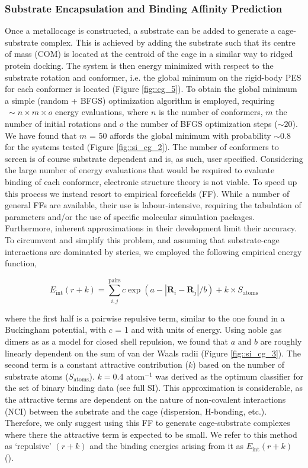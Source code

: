 \documentclass[../../main.tex]{subfiles}
\begin{document}
\subsubsection{Substrate Encapsulation and Binding Affinity Prediction}
 Once a metallocage is constructed, a substrate can be added to generate a cage-substrate complex. This is achieved by adding the substrate such that its centre of mass (COM) is located at the centroid of the cage in a similar way to ridged protein docking. The system is then energy minimized with respect to the substrate rotation and conformer, i.e. the global minimum on the rigid-body PES for each conformer is located (Figure \ref{fig::cg_5}). To obtain the global minimum a simple (random + BFGS) optimization algorithm is employed,\cite{SciPy} requiring $~\sim n\times m\times o$ energy evaluations, where $n$ is the number of conformers, $m$ the number of initial rotations and $o$ the number of BFGS optimization steps ($\sim20$). We have found that $m$ = 50 affords the global minimum with probability $\sim0.8$ for the systems tested (Figure \ref{fig::si_cg_2}). The number of conformers to screen is of course substrate dependent and is, as such, user specified.
Considering the large number of energy evaluations that would be required to evaluate binding of each conformer, electronic structure theory is not viable. To speed up this process we instead resort to empirical forcefields (FF). While a number of general FFs are available, their use is labour-intensive, requiring the tabulation of parameters and/or the use of specific molecular simulation packages. Furthermore, inherent approximations in their development limit their accuracy. To circumvent and simplify this problem, and assuming that substrate-cage interactions are dominated by sterics, we employed the following empirical energy function,

\begin{equation}
	E_\text{int}(r+k) = \sum_{i,j}^\text{pairs}  c \exp(a - |\boldsymbol{R}_i - \boldsymbol{R}_j|/b) +  k \times S_\text{atoms}	
\end{equation}

where the first half is a pairwise repulsive term, similar to the one found in a Buckingham potential, with $c$ = 1 and with units of energy. Using noble gas dimers as as a model for closed shell repulsion, we found that $a$ and $b$ are roughly linearly dependent on the sum of van der Waals radii (Figure \ref{fig::si_cg_3}). The second term is a constant attractive contribution ($k$) based on the number of substrate atoms ($S_\text{atoms}$). $k = 0.4$ \kcalx atom$^{-1}$ was derived as the optimum classifier for the set of binary binding data (see full SI). This approximation is considerable, as the attractive terms are dependent on the nature of non-covalent interactions (NCI) between the substrate and the cage (dispersion, H-bonding, etc.). Therefore, we only suggest using this FF to generate cage-substrate complexes where there the attractive term is expected to be small. We refer to this method as ‘repulsive’ $(r+k)$ and the binding energies arising from it as $E_\text{int}(r+k)$ ().
\end{document}
